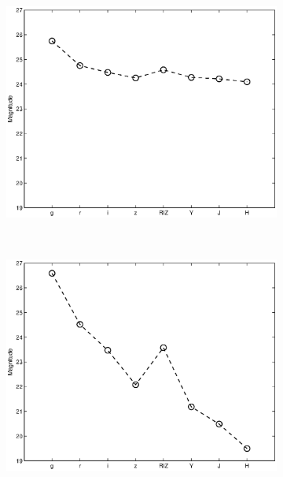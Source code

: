 \documentclass[useAMS,usenatbib,fleqn]{mn2e}
\begin{document}
\begin{figure}
\begin{subfigure}[b]{0.175\textwidth}
                \includegraphics[width=\textwidth]{figures/basis_03.eps}
        \end{subfigure}
        ~
        \begin{subfigure}[b]{0.175\textwidth}
                \includegraphics[width=\textwidth]{figures/basis_04.eps}
        \end{subfigure}
        ~
        \begin{subfigure}[b]{0.175\textwidth}

\end{subfigure}
\end{figure}
\end{document}
